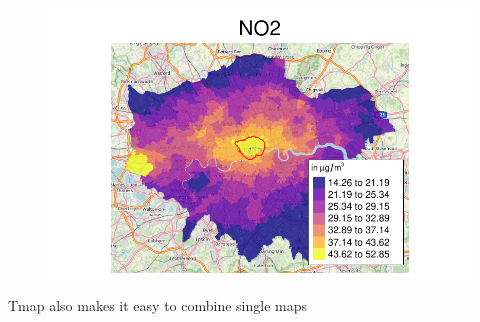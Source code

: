 \documentclass[
  letterpaper,
  DIV=11,
  numbers=noendperiod]{scrreprt}
\begin{document}
\begin{figure}[H]

{\centering \includegraphics{02_spatial-data_files/figure-pdf/unnamed-chunk-19-1.pdf}

}

\end{figure}

Tmap also makes it easy to combine single maps
\end{document}

